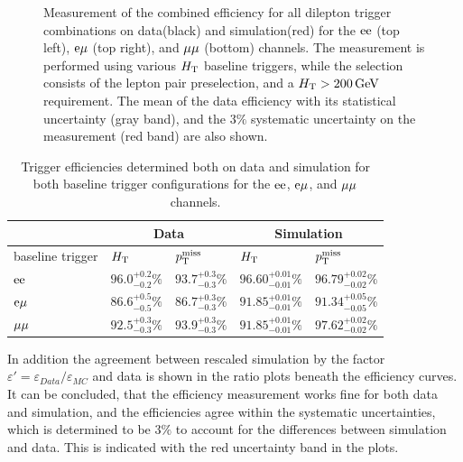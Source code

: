 \begin{figure}[htb]
 \caption{Measurement of the combined efficiency for all dilepton trigger combinations on data(black) and simulation(red) for the $\mathrm{e}\mathrm{e}$ (top left), $\mathrm{e}\mu$ (top right), and $\mu\mu$ (bottom) channels. The measurement is performed using various $H_{\mathrm{T}}$ baseline triggers, while the selection consists of the lepton pair preselection, and a $H_{\mathrm{T}}>200\,\text{Ge\hspace{-.08em}V}$ requirement. The mean of the data efficiency with its statistical uncertainty (gray band), and the $3\%$ systematic uncertainty on the measurement (red band) are also shown.}
 \label{fig:triggEff}
\end{figure}


\begin{table}[htb]
 \centering
 \caption{Trigger efficiencies determined both on data and simulation for both baseline trigger
  configurations for the $\mathrm{e}\mathrm{e}$, $\mathrm{e}{\mu}$, and ${\mu}{\mu}$ channels.}
 \label{tab:triggEff}
 \begin{tabular}{lllll}
                   & \multicolumn{2}{c}{Data} & \multicolumn{2}{c}{Simulation}                                                         \\\hline
  baseline trigger & $H_{\mathrm{T}}$                    & $p_{\mathrm{T}}^\text{miss}$                      & $H_{\mathrm{T}}$                     & $p_{\mathrm{T}}^\text{miss}$                 \\\hline
  $\mathrm{e}\mathrm{e}$         & $96.0^{+0.2}_{-0.2}\%$   & $93.7^{+0.3}_{-0.3}\%$         & $96.60^{+0.01}_{-0.01}\%$ & $96.79^{+0.02}_{-0.02}\%$ \\
  $\mathrm{e}{\mu}$        & $86.6^{+0.5}_{-0.5}\%$   & $86.7^{+0.3}_{-0.3}\%$         & $91.85^{+0.01}_{-0.01}\%$ & $91.34^{+0.05}_{-0.05}\%$ \\
  ${\mu}{\mu}$       & $92.5^{+0.3}_{-0.3}\%$   & $93.9^{+0.3}_{-0.3}\%$         & $91.85^{+0.01}_{-0.01}\%$ & $97.62^{+0.02}_{-0.02}\%$ \\\hline
 \end{tabular}
\end{table}


In addition the agreement between rescaled simulation by the factor $\varepsilon'=\varepsilon_{Data}/\varepsilon_{MC}$ and data is shown in the ratio plots beneath the efficiency curves. It can be concluded, that the efficiency measurement works fine for both data and simulation, and the efficiencies agree within the systematic uncertainties, which is determined to be $3\%$ to account for the differences between simulation and data. This is indicated with the red uncertainty band in the plots.\\

